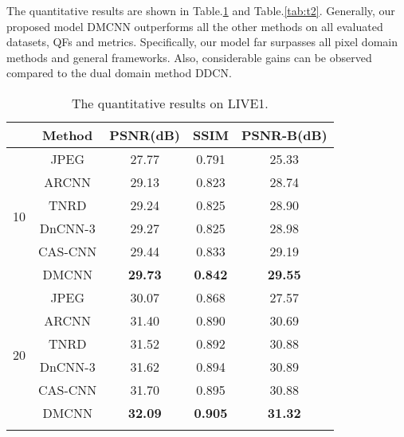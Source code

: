 \documentclass{article}
\begin{document}
The quantitative results are shown in Table.\ref{tab:t1} and
Table.\ref{tab:t2}. Generally, our
proposed model DMCNN outperforms all the other methods on all evaluated
datasets, QFs and metrics. Specifically, our model far surpasses all
pixel domain methods and general frameworks. Also, considerable gains
can be observed compared to the dual domain method DDCN.

\begin{table}[!htb]
  \vspace{-0.5cm}
  \caption{The quantitative results on LIVE1.}\medskip
  \vspace{-0.1cm}
  \centering
  \begin{tabular}{c|c|c|c|c}
  \Xhline{2\arrayrulewidth}{QF}
  &Method                            &PSNR(dB)       &SSIM           &PSNR-B(dB)    \\ 
  \hline
  \multirow{6}{*}{10}
  &JPEG                              &27.77          &0.791          &25.33         \\
  &ARCNN \cite{dong2015compression}  &29.13          &0.823          &28.74         \\
  &TNRD \cite{chen2017trainable}     &29.24          &0.825          &28.90         \\
  &DnCNN-3 \cite{zhang2017beyond}    &29.27          &0.825          &28.98         \\
  &CAS-CNN \cite{cavigelli2017cas}   &29.44          &0.833          &29.19         \\
  &DMCNN                             &\textbf{29.73} &\textbf{0.842} &\textbf{29.55}\\
  \hline
  \multirow{6}{*}{20}
  &JPEG                              &30.07          &0.868          &27.57         \\
  &ARCNN \cite{dong2015compression}  &31.40          &0.890          &30.69         \\
  &TNRD \cite{chen2017trainable}     &31.52          &0.892          &30.88         \\
  &DnCNN-3 \cite{zhang2017beyond}    &31.62          &0.894          &30.89         \\
  &CAS-CNN \cite{cavigelli2017cas}   &31.70          &0.895          &30.88         \\
  &DMCNN                             &\textbf{32.09} &\textbf{0.905} &\textbf{31.32}\\
  \Xhline{2\arrayrulewidth}
  \multicolumn{5}{c}{}\\
\end{tabular}
\label{tab:t1}
\vspace{-0.8cm}
\end{table}
\end{document}
